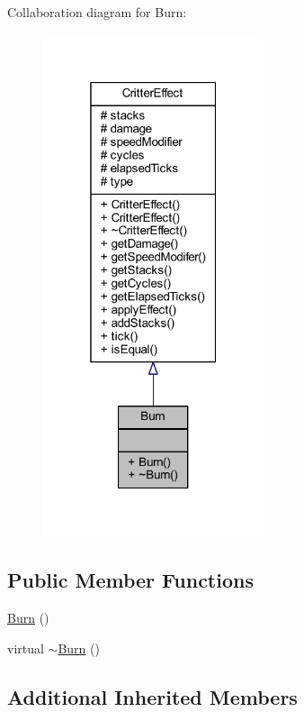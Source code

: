 Collaboration diagram for Burn\+:
\nopagebreak
\begin{figure}[H]
\begin{center}
\leavevmode
\includegraphics[width=184pt]{struct_burn__coll__graph}
\end{center}
\end{figure}
\subsection*{Public Member Functions}
\begin{DoxyCompactItemize}
\item 
\hyperlink{struct_burn_acc5865b4cf477642e883e3132dea63c1}{Burn} ()
\item 
virtual \hyperlink{struct_burn_a32fb25058e7d58dd93ccd8e096374662}{$\sim$\+Burn} ()
\end{DoxyCompactItemize}
\subsection*{Additional Inherited Members}


